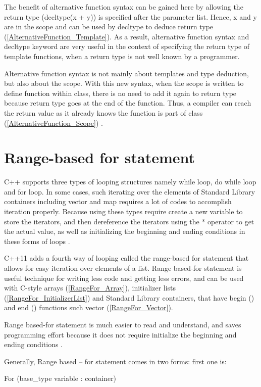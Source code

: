 \documentclass[11pt]{report}
\begin{document}
The benefit of alternative function syntax can be gained here by allowing the return type (decltype(x + y)) is specified after the parameter list. Hence, x and y are in the scope and can be used by decltype to deduce return type (\ref{AlternativeFunction_Template}). As a result, alternative function syntax and decltype keyword are very useful in the context of specifying the return type of template functions, when a return type is not well known by a programmer\cite{Prata:2012:Cpp}.


Alternative function syntax is not mainly about templates and type deduction, but also about the scope.  With this new syntax, when the scope is written to define function within class, there is no need to add it again to return type because return type goes at the end of the function. Thus, a compiler can reach the return value as it already knows the function is part of class (\ref{AlternativeFunction_Scope}) \cite{Allain:2011:FutureCpp}.

\section{Range-based for statement}
\label{section: Range-based for statement}
C++ supports three types of looping structures namely while loop, do while loop and for loop. In some cases, such iterating over the elements of Standard Library containers including vector and map requires a lot of codes to accomplish iteration properly. Because using these types require create a new variable to store the iterators, and then dereference the iterators using the * operator to get the actual value, as well as initializing the beginning and ending conditions in these forms of loops \cite{Horstmann:2008:BC}.


C++11 adds a fourth way of looping called the range-based for statement that allows for easy iteration over elements of a list. Range based-for statement is useful technique for writing less code and getting less errors, and can be used with C-style arrays (\ref{RangeFor_Array}), initializer lists (\ref{RangeFor_InitializerList}) and Standard Library containers, that have begin () and end () functions such vector (\ref{RangeFor_Vector}). 


Range based-for statement is much easier to read and understand, and saves programming effort because it does not require initialize the beginning and ending conditions \cite{Overland:2011:CWF}.


Generally, Range based – for statement comes in two forms: first one is:
\begin{center}
For (base\_type  variable : container)
\end{center} 
\end{document}
